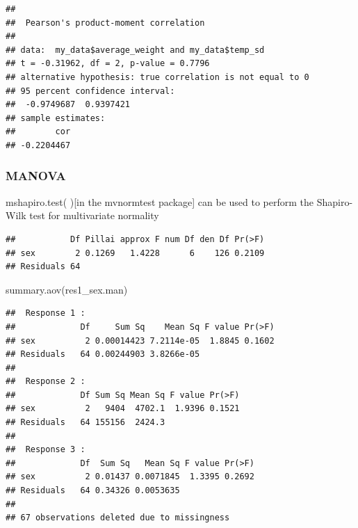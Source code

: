\documentclass[
]{article}
\newenvironment{Shaded}{\begin{snugshade}}{\end{snugshade}}
\newcommand{\AttributeTok}[1]{\textcolor[rgb]{0.77,0.63,0.00}{#1}}
\newcommand{\FunctionTok}[1]{\textcolor[rgb]{0.00,0.00,0.00}{#1}}
\newcommand{\NormalTok}[1]{#1}
\newcommand{\OtherTok}[1]{\textcolor[rgb]{0.56,0.35,0.01}{#1}}
\newcommand{\SpecialCharTok}[1]{\textcolor[rgb]{0.00,0.00,0.00}{#1}}
\begin{document}
\begin{verbatim}
## 
##  Pearson's product-moment correlation
## 
## data:  my_data$average_weight and my_data$temp_sd
## t = -0.31962, df = 2, p-value = 0.7796
## alternative hypothesis: true correlation is not equal to 0
## 95 percent confidence interval:
##  -0.9749687  0.9397421
## sample estimates:
##        cor 
## -0.2204467
\end{verbatim}

\hypertarget{manova}{%
\subsubsection{MANOVA}\label{manova}}

mshapiro.test( ){[}in the mvnormtest package{]} can be used to perform
the Shapiro-Wilk test for multivariate normality

\begin{Shaded}
\end{Shaded}

\begin{verbatim}
##           Df Pillai approx F num Df den Df Pr(>F)
## sex        2 0.1269   1.4228      6    126 0.2109
## Residuals 64
\end{verbatim}

\begin{Shaded}
\begin{Highlighting}[]
\FunctionTok{summary.aov}\NormalTok{(res1\_sex.man)}
\end{Highlighting}
\end{Shaded}

\begin{verbatim}
##  Response 1 :
##             Df     Sum Sq    Mean Sq F value Pr(>F)
## sex          2 0.00014423 7.2114e-05  1.8845 0.1602
## Residuals   64 0.00244903 3.8266e-05               
## 
##  Response 2 :
##             Df Sum Sq Mean Sq F value Pr(>F)
## sex          2   9404  4702.1  1.9396 0.1521
## Residuals   64 155156  2424.3               
## 
##  Response 3 :
##             Df  Sum Sq   Mean Sq F value Pr(>F)
## sex          2 0.01437 0.0071845  1.3395 0.2692
## Residuals   64 0.34326 0.0053635               
## 
## 67 observations deleted due to missingness
\end{verbatim}
\end{document}
